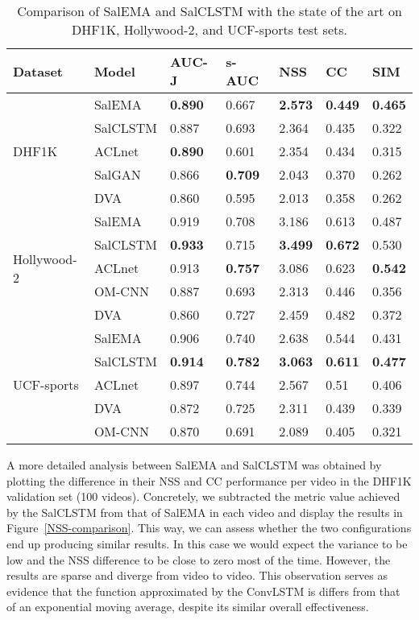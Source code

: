 \documentclass{bmvc2k}
\begin{document}
\begin{table}[t]
\begin{center}
\begin{tabularx}{\textwidth}{lXlllll}
\toprule
\textbf{Dataset}&\textbf{Model}  & \textbf{AUC-J}  &\textbf{s-AUC} & \textbf{NSS} 	&  \textbf{CC}  & \textbf{SIM}\\
\midrule
\multirow{5}{*}{DHF1K}&SalEMA & \textbf{0.890}	& 0.667 & \textbf{2.573} & \textbf{0.449} & \textbf{0.465}\\
&SalCLSTM & 0.887 & 0.693 & 2.364 & 0.435 & 0.322  \\
&ACLnet \cite{Wang2018a}& \textbf{0.890}	&	0.601	&	2.354		&	0.434 &	0.315	 \\
&SalGAN \cite{Pan2017} & 0.866	& \textbf{0.709}	& 2.043	& 0.370	 & 0.262\\
&DVA \cite{DVA}& 0.860 & 0.595	& 2.013	& 0.358		& 0.262\\
\midrule
\multirow{5}{*}{Hollywood-2}&SalEMA & 0.919	&	0.708	&	3.186	&	0.613 &	0.487\\
&SalCLSTM  & \textbf{0.933} & 0.715	& \textbf{3.499}	& \textbf{0.672}	& 0.530 \\
&ACLnet \cite{Wang2018a} & 0.913	& \textbf{0.757} & 3.086 & 0.623 & \textbf{0.542} \\
&OM-CNN \cite{jiang2017predicting} & 0.887	& 0.693	& 2.313	& 0.446	 & 0.356\\
&DVA \cite{DVA}& 0.860 & 0.727	& 2.459	& 0.482		& 0.372\\
\midrule
\multirow{5}{*}{UCF-sports}&SalEMA & 0.906	&	0.740	&	2.638	& 0.544 &	0.431\\
&SalCLSTM &\textbf{0.914}	&\textbf{0.782} & \textbf{3.063} & \textbf{0.611} & \textbf{0.477} \\
&ACLnet \cite{Wang2018a} &0.897	& 0.744	& 2.567&	0.51&	0.406 \\
&DVA \cite{DVA}& 0.872 & 0.725	& 2.311	& 0.439		& 0.339\\
&OM-CNN \cite{jiang2017predicting} & 0.870	& 0.691	& 2.089	& 0.405	 & 0.321\\
\bottomrule
\end{tabularx}
\end{center}

\caption{Comparison of SalEMA and SalCLSTM with the state of the art on DHF1K, Hollywood-2, and UCF-sports test sets.}
\label{tab:SoA}
\end{table}

A more detailed analysis between SalEMA and SalCLSTM was obtained by plotting the difference in their NSS and CC performance per video in the DHF1K validation set (100 videos). Concretely, we subtracted the metric value achieved by the SalCLSTM from that of SalEMA in each video and display the results in Figure~\ref{NSS-comparison}. This way, we can assess whether the two configurations end up producing similar results.
In this case we would expect the variance to be low and the NSS difference to be close to zero most of the time. However, the results are sparse and diverge from video to video. This observation serves as evidence that the function approximated by the ConvLSTM is differs from that of an exponential moving average, despite its similar overall effectiveness.
\end{document}
